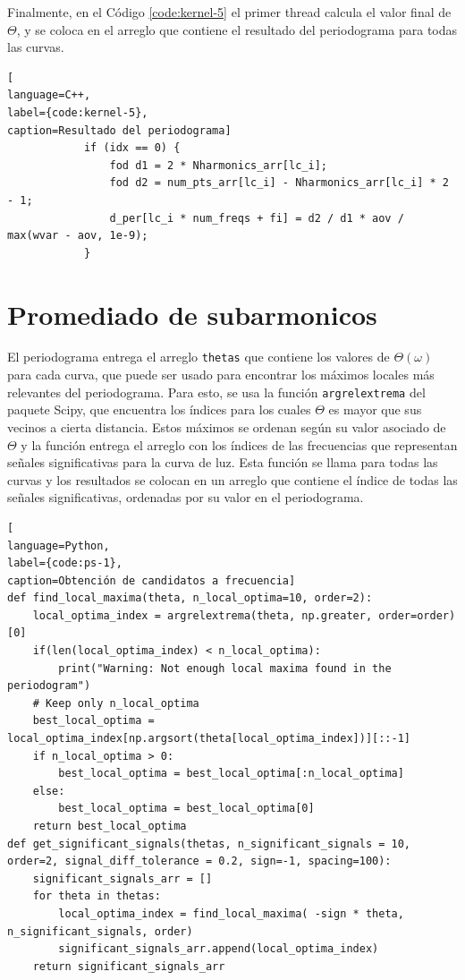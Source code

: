 Finalmente, en el Código \ref{code:kernel-5} el primer thread calcula el valor final de $\Theta$, y se coloca en el arreglo que contiene el resultado del periodograma para todas las curvas.
\begin{lstlisting}[
language=C++,
label={code:kernel-5},
caption=Resultado del periodograma]
            if (idx == 0) {
                fod d1 = 2 * Nharmonics_arr[lc_i];
                fod d2 = num_pts_arr[lc_i] - Nharmonics_arr[lc_i] * 2 - 1;
                d_per[lc_i * num_freqs + fi] = d2 / d1 * aov / max(wvar - aov, 1e-9);
            }
\end{lstlisting}

\section{Promediado de subarmonicos}\label{sec:subarmonicos-implementacion}
El periodograma entrega el arreglo \texttt{thetas} que contiene los valores de $\Theta(\omega)$ para cada curva, que puede ser usado para encontrar los máximos locales más relevantes del periodograma. Para esto, se usa la función \texttt{argrelextrema} del paquete Scipy, que encuentra los índices para los cuales $\Theta$ es mayor que sus vecinos a cierta distancia. Estos máximos se ordenan según su valor asociado de $\Theta$ y la función entrega el arreglo con los índices de las frecuencias que representan señales significativas para la curva de luz. Esta función se llama para todas las curvas y los resultados se colocan en un arreglo que contiene el índice de todas las señales significativas, ordenadas por su valor en el periodograma.
\begin{lstlisting}[
language=Python,
label={code:ps-1},
caption=Obtención de candidatos a frecuencia]
def find_local_maxima(theta, n_local_optima=10, order=2):
    local_optima_index = argrelextrema(theta, np.greater, order=order)[0]
    if(len(local_optima_index) < n_local_optima):
        print("Warning: Not enough local maxima found in the periodogram")
    # Keep only n_local_optima
    best_local_optima = local_optima_index[np.argsort(theta[local_optima_index])][::-1]
    if n_local_optima > 0:
        best_local_optima = best_local_optima[:n_local_optima]
    else:
        best_local_optima = best_local_optima[0]
    return best_local_optima
def get_significant_signals(thetas, n_significant_signals = 10, order=2, signal_diff_tolerance = 0.2, sign=-1, spacing=100):
    significant_signals_arr = []
    for theta in thetas:
        local_optima_index = find_local_maxima( -sign * theta, n_significant_signals, order)
        significant_signals_arr.append(local_optima_index)
    return significant_signals_arr
\end{lstlisting}
